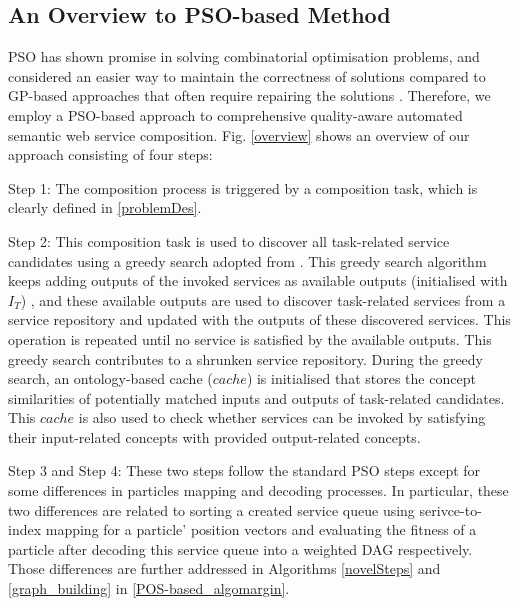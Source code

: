 \documentclass{llncs}
\begin{document}
\subsection{An Overview to PSO-based Method}\label{PSO_based_approach}

PSO has shown promise in solving combinatorial optimisation problems, and considered an easier way to maintain the correctness of solutions compared to GP-based approaches that often require repairing the solutions \cite{da2016particle}. Therefore, we employ a PSO-based approach to comprehensive quality-aware automated semantic web service composition. Fig. \ref{overview} shows an overview of our approach consisting of four steps: 

Step 1: The composition process is triggered by a composition task, which is clearly defined in \ref{problemDes}. 

Step 2: This composition task is used to discover all task-related service candidates using a greedy search adopted from \cite{ma2015hybrid}. This greedy search algorithm keeps adding outputs of the invoked services as available outputs (initialised with $I_{T}$) , and these available outputs are used to discover task-related services from a service repository and updated with the outputs of these discovered services. This operation is repeated until no service is satisfied by the available outputs. This greedy search contributes to a shrunken service repository. During the greedy search, an ontology-based cache ($cache$) is initialised that stores the concept similarities of potentially matched inputs and outputs of task-related candidates. This $cache$ is also used to check whether services can be invoked by satisfying their input-related concepts with provided output-related concepts.

Step 3 and Step 4: These two steps follow the standard PSO steps \cite{shi2001particle} except for some differences in particles mapping and decoding processes. In particular, these two differences are related to sorting a created service queue using serivce-to-index mapping for a particle' position vectors and evaluating the fitness of a particle after decoding this service queue into a weighted DAG respectively. Those differences are further addressed in Algorithms \ref{novelSteps} and \ref{graph_building} in \ref{POS-based_algomargin}.
\end{document}
